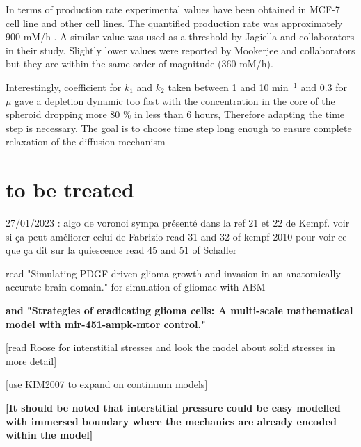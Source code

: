 \documentclass[11pt,a4paper]{article}
\begin{document}
In terms of production rate experimental values have been obtained in MCF-7 cell line and other cell lines. The quantified production rate was approximately 900 mM/h \cite{RomeroAgilent}. A similar value was used as a threshold by Jagiella and collaborators in their study.\cite{Jagiella2016} Slightly lower values were reported by Mookerjee and collaborators but they are within the same order of magnitude (360 mM/h).\cite{Mookerjee2017}


Interestingly, coefficient for $k_1$ and $k_2$ taken between 1 and 10 min$^{-1}$ and 0.3 for $\mu$ gave a depletion dynamic too fast with the concentration in the core of the spheroid dropping more 80 \% in less than  6 hours, Therefore adapting the time step is necessary. The goal is to choose time step long enough to ensure complete relaxation of the diffusion mechanism 

\section*{to be treated}

27/01/2023 : algo de voronoi sympa présenté dans la ref 21 et 22 de Kempf. voir si ça peut améliorer celui de Fabrizio
	read 31 and 32 of kempf 2010 pour voir ce que ça dit sur la quiescence
	read 45  and 51 of Schaller

read "Simulating PDGF-driven glioma growth and invasion in an anatomically accurate brain domain." for simulation of gliomae with ABM

\textbf{and "Strategies of eradicating glioma cells: A multi-scale mathematical model with mir-451-ampk-mtor control."}

[read Roose for interstitial stresses and look the model about solid stresses in more detail]

[use KIM2007 to expand on continuum models]

\textbf{[It should be noted that interstitial pressure could be easy modelled with immersed boundary where the mechanics are already encoded within the model]}
\end{document}
